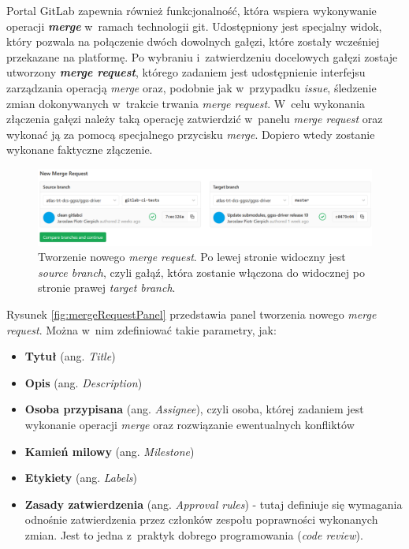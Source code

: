 Portal GitLab zapewnia również funkcjonalność, która wspiera wykonywanie operacji \textit{\textbf{merge}} w~ramach technologii \gls*{git}. Udostępniony jest specjalny widok, który pozwala na połączenie dwóch dowolnych gałęzi, które zostały wcześniej przekazane na platformę. Po wybraniu i~zatwierdzeniu docelowych gałęzi zostaje utworzony \textit{\textbf{merge request}}, którego zadaniem jest udostępnienie interfejsu zarządzania operacją \textit{merge} oraz, podobnie jak w~przypadku \textit{issue}, śledzenie zmian dokonywanych w~trakcie trwania \textit{merge request}. W~celu wykonania złączenia gałęzi należy taką operację zatwierdzić w~panelu \textit{merge request} oraz wykonać ją za pomocą specjalnego przycisku \textit{merge}. Dopiero wtedy zostanie wykonane faktyczne złączenie.\par

\begin{figure}[H]
\centering
\includegraphics[width=\textwidth]{res/png/newMergeRequest}
\caption{Tworzenie nowego \textit{merge request}. Po lewej stronie widoczny jest \textit{source branch}, czyli gałąź, która zostanie włączona do widocznej po stronie prawej \textit{target branch}.}
\end{figure}

\newpage

Rysunek \ref{fig:mergeRequestPanel} przedstawia panel tworzenia nowego \textit{merge request}. Można w~nim zdefiniować takie parametry, jak:
\begin{itemize}
\item \textbf{Tytuł} (ang. \textit{Title})
\item \textbf{Opis} (ang. \textit{Description})
\item \textbf{Osoba przypisana} (ang. \textit{Assignee}), czyli osoba, której zadaniem jest wykonanie operacji \textit{merge} oraz rozwiązanie ewentualnych konfliktów
\item \textbf{Kamień milowy} (ang. \textit{Milestone})
\item \textbf{Etykiety} (ang. \textit{Labels})
\item \textbf{Zasady zatwierdzenia} (ang. \textit{Approval rules}) - tutaj definiuje się wymagania odnośnie zatwierdzenia przez członków zespołu poprawności wykonanych zmian. Jest to jedna z~praktyk dobrego programowania (\textit{code review}).
\end{itemize}

